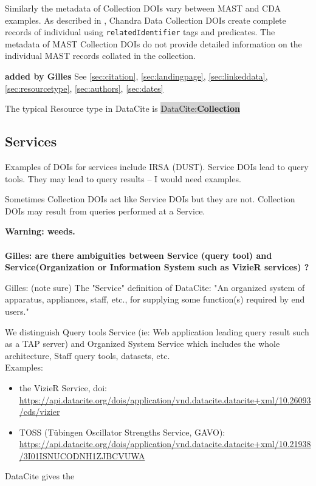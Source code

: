 \documentclass[11pt,a4paper]{ivoa}
\newcommand{\dataciteterm}[1]{\colorbox{lightgray}{DataCite:\textbf{#1}}}
\begin{document}
Similarly the metadata of Collection DOIs vary between MAST and CDA examples. 
As described in \citet{2023ChNew..34....5D}, Chandra Data Collection DOIs create complete records of individual using \texttt{relatedIdentifier} tags and predicates. 
The metadata of MAST Collection DOIs do not provide detailed information on the individual MAST records collated in the collection.


\textbf{\color{red} added by Gilles}
See \ref{sec:citation}, \ref{sec:landingpage}, \ref{sec:linkeddata}, \ref{sec:resourcetype}, \ref{sec:authors}, \ref{sec:dates}

The typical Resource type in DataCite is \dataciteterm{Collection}

\subsection{Services}
\label{sec:intro:services}

Examples of DOIs for services include IRSA (DUST).
Service DOIs lead to query tools.
They may lead to query results -- I would need examples.

Sometimes Collection DOIs act like Service DOIs but they are not.
Collection DOIs may result from queries performed at a Service.

\textbf{Warning: weeds.}

\paragraph{}
\textbf{\color{red} Gilles: are there ambiguities between Service (query tool) and Service(Organization or Information System such as VizieR services) ?\\}

{\color{red} Gilles: (note sure)
    The "Service" definition of DataCite: "An organized system of apparatus, appliances, staff, etc., for supplying some function(s) required by end users."

    We distinguish Query tools Service (ie: Web application leading query result such as a TAP server) and Organized System Service which includes the whole architecture, Staff query tools, datasets, etc. \\
    
    Examples:
    \begin{itemize}
    	\item the VizieR Service, doi:\\ \url{https://api.datacite.org/dois/application/vnd.datacite.datacite+xml/10.26093/cds/vizier}
    	\item TOSS (Tübingen Oscillator Strengths Service, GAVO):\\ \url{https://api.datacite.org/dois/application/vnd.datacite.datacite+xml/10.21938/3I01ISNUCODNH1ZJBCVUWA}
    \end{itemize} 

    DataCite gives the 
}
\end{document}
